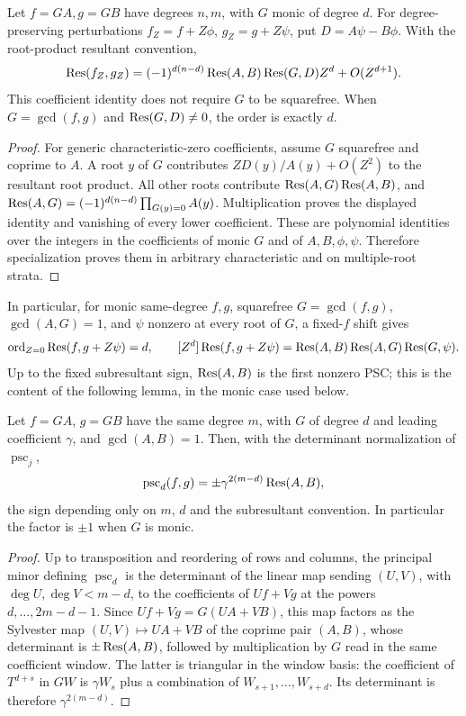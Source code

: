 \begin{theorem}\label{frontier:thm:shift-psc}
Let $f=GA,g=GB$ have degrees $n,m$, with $G$ monic of degree $d$.
For degree-preserving perturbations $f_Z=f+Z\phi$, $g_Z=g+Z\psi$, put
$D=A\psi-B\phi$. With the root-product resultant convention,
\[
\operatorname{Res}(f_Z,g_Z)=(-1)^{d(n-d)}\operatorname{Res}(A,B)\operatorname{Res}(G,D)Z^d+O(Z^{d+1}).
\]
This coefficient identity does not require $G$ to be squarefree. When
$G=\gcd(f,g)$ and $\operatorname{Res}(G,D)\ne0$, the order is exactly $d$.
\end{theorem}
\begin{proof}
For generic characteristic-zero coefficients, assume $G$ squarefree and
coprime to $A$. A root $y$ of $G$ contributes $ZD(y)/A(y)+O(Z^2)$ to the
resultant root product. All other roots contribute
$\operatorname{Res}(A,G)\operatorname{Res}(A,B)$, and
$\operatorname{Res}(A,G)=(-1)^{d(n-d)}\prod_{G(y)=0}A(y)$.
Multiplication proves the displayed identity and vanishing of every lower
coefficient. These are polynomial identities over the integers in the
coefficients of monic $G$ and of $A,B,\phi,\psi$. Therefore specialization
proves them in arbitrary characteristic and on multiple-root strata.
\end{proof}

In particular, for monic same-degree $f,g$, squarefree $G=\gcd(f,g)$,
$\gcd(A,G)=1$, and $\psi$ nonzero at every root of $G$, a fixed-$f$ shift gives
\[
\operatorname{ord}_{Z=0}\operatorname{Res}(f,g+Z\psi)=d,\qquad
[Z^d]\operatorname{Res}(f,g+Z\psi)=\operatorname{Res}(A,B)\operatorname{Res}(A,G)\operatorname{Res}(G,\psi).
\]
Up to the fixed subresultant sign, $\operatorname{Res}(A,B)$ is the first nonzero PSC;
this is the content of the following lemma, in the monic case used below.

\begin{lemma}\label{frontier:lem:psc-value}
Let $f=GA$, $g=GB$ have the same degree $m$, with $G$ of degree $d$ and
leading coefficient $\gamma$, and $\gcd(A,B)=1$. Then, with the determinant
normalization of $\operatorname{psc}_j$,
\[
 \operatorname{psc}_d(f,g)=\pm\gamma^{2(m-d)}\operatorname{Res}(A,B),
\]
the sign depending only on $m$, $d$ and the subresultant convention.
In particular the factor is $\pm1$ when $G$ is monic.
\end{lemma}
\begin{proof}
Up to transposition and reordering of rows and columns, the principal minor
defining $\operatorname{psc}_d$ is the determinant of the linear map sending
$(U,V)$, with $\deg U,\deg V<m-d$, to the coefficients of $Uf+Vg$ at the
powers $d,\ldots,2m-d-1$. Since $Uf+Vg=G(UA+VB)$, this map factors as the
Sylvester map $(U,V)\mapsto UA+VB$ of the coprime pair $(A,B)$, whose
determinant is $\pm\operatorname{Res}(A,B)$, followed by multiplication by $G$ read in the
same coefficient window. The latter is triangular in the window basis: the
coefficient of $T^{d+s}$ in $GW$ is $\gamma W_s$ plus a combination of
$W_{s+1},\ldots,W_{s+d}$. Its determinant is therefore
$\gamma^{2(m-d)}$.
\end{proof}

